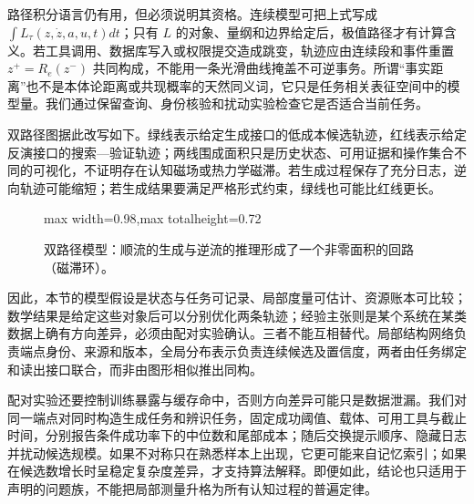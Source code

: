 路径积分语言仍有用，但必须说明其资格。连续模型可把上式写成 $\int L_\tau(z,\dot z,a,u,t)dt$；只有 $L$ 的对象、量纲和边界给定后，极值路径才有计算含义。若工具调用、数据库写入或权限提交造成跳变，轨迹应由连续段和事件重置 $z^+=R_e(z^-)$ 共同构成，不能用一条光滑曲线掩盖不可逆事务。所谓“事实距离”也不是本体论距离或共现概率的天然同义词，它只是任务相关表征空间中的模型量。我们通过保留查询、身份核验和扰动实验检查它是否适合当前任务。

双路径图据此改写如下。绿线表示给定生成接口的低成本候选轨迹，红线表示给定反演接口的搜索—验证轨迹；两线围成面积只是历史状态、可用证据和操作集合不同的可视化，不证明存在认知磁场或热力学磁滞。若生成过程保存了充分日志，逆向轨迹可能缩短；若生成结果要满足严格形式约束，绿线也可能比红线更长。

\begin{figure}[htbp]
    \centering
    \begin{adjustbox}{max width=0.98\linewidth,max totalheight=0.72\textheight}
\end{adjustbox}
    \caption{双路径模型：顺流的生成与逆流的推理形成了一个非零面积的回路（磁滞环）。}
\end{figure}

因此，本节的模型假设是状态与任务可记录、局部度量可估计、资源账本可比较；数学结果是给定这些对象后可以分别优化两条轨迹；经验主张则是某个系统在某类数据上确有方向差异，必须由配对实验确认。三者不能互相替代。局部结构网络负责端点身份、来源和版本，全局分布表示负责连续候选及置信度，两者由任务绑定和读出接口联合，而非由图形相似推出同构。

配对实验还要控制训练暴露与缓存命中，否则方向差异可能只是数据泄漏。我们对同一端点对同时构造生成任务和辨识任务，固定成功阈值、载体、可用工具与截止时间，分别报告条件成功率下的中位数和尾部成本；随后交换提示顺序、隐藏日志并扰动候选规模。如果不对称只在熟悉样本上出现，它更可能来自记忆索引；如果在候选数增长时呈稳定复杂度差异，才支持算法解释。即便如此，结论也只适用于声明的问题族，不能把局部测量升格为所有认知过程的普遍定律。

